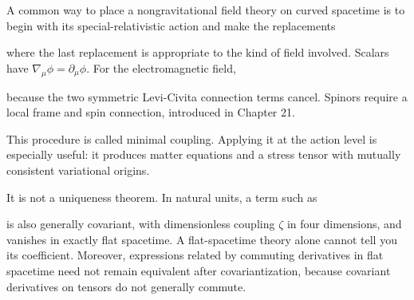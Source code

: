 \documentclass[
  11pt,
  letterpaper,
  oneside,
  openany]{scrbook}
\begin{document}
A common way to place a nongravitational field theory on curved
spacetime is to begin with its special-relativistic action and make the
replacements

\begin{center}
\begingroup
{}
\ifdim\wd\grmathbox>\linewidth
\resizebox{\linewidth}{!}{\usebox{\grmathbox}}
\else\usebox{\grmathbox}\fi
\endgroup
\end{center}

where the last replacement is appropriate to the kind of field involved.
Scalars have \(\nabla_\mu\phi=\partial_\mu\phi\). For the
electromagnetic field,

\begin{center}
\begingroup
{}
\ifdim\wd\grmathbox>\linewidth
\resizebox{\linewidth}{!}{\usebox{\grmathbox}}
\else\usebox{\grmathbox}\fi
\endgroup
\end{center}

because the two symmetric Levi-Civita connection terms cancel. Spinors
require a local frame and spin connection, introduced in Chapter 21.

This procedure is called minimal coupling. Applying it at the action
level is especially useful: it produces matter equations and a stress
tensor with mutually consistent variational origins.

It is not a uniqueness theorem. In natural units, a term such as

\begin{center}
\begingroup
{}
\ifdim\wd\grmathbox>\linewidth
\resizebox{\linewidth}{!}{\usebox{\grmathbox}}
\else\usebox{\grmathbox}\fi
\endgroup
\end{center}

is also generally covariant, with dimensionless coupling \(\zeta\) in
four dimensions, and vanishes in exactly flat spacetime. A
flat-spacetime theory alone cannot tell you its coefficient. Moreover,
expressions related by commuting derivatives in flat spacetime need not
remain equivalent after covariantization, because covariant derivatives
on tensors do not generally commute.
\end{document}
